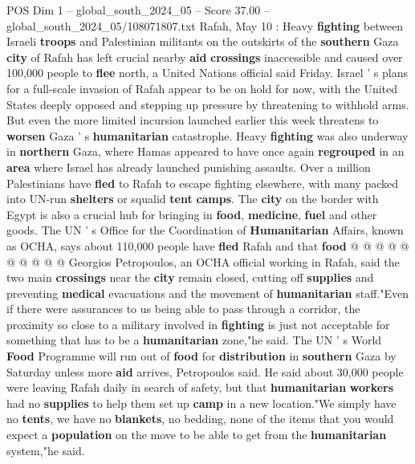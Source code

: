 \begin{textsample}{POS Dim 1 – global\_south\_2024\_05 – Score 37.00 – global\_south\_2024\_05/108071807.txt}  \label{ex:f1_pos_074}
Rafah, May 10 : Heavy \textbf{fighting} between Israeli \textbf{troops} and Palestinian militants on the outskirts of the \textbf{southern} Gaza \textbf{city} of Rafah has left crucial nearby \textbf{aid} \textbf{crossings} inaccessible and caused over 100,000 people to \textbf{flee} north, a United Nations official said Friday.
Israel ' s plans for a full-scale invasion of Rafah appear to be on hold for now, with the United States deeply opposed and stepping up pressure by threatening to withhold arms.
But even the more limited incursion launched earlier this week threatens to \textbf{worsen} Gaza ' s \textbf{humanitarian} catastrophe.
Heavy \textbf{fighting} was also underway in \textbf{northern} Gaza, where Hamas appeared to have once again \textbf{regrouped} in an \textbf{area} where Israel has already launched punishing assaults.
Over a million Palestinians have \textbf{fled} to Rafah to escape fighting elsewhere, with many packed into UN-run \textbf{shelters} or squalid \textbf{tent} \textbf{camps}.
The \textbf{city} on the border with Egypt is also a crucial hub for bringing in \textbf{food}, \textbf{medicine}, \textbf{fuel} and other goods.
The UN ' s Office for the Coordination of \textbf{Humanitarian} Affairs, known as OCHA, says about 110,000 people have \textbf{fled} Rafah and that \textbf{food} @ @ @ @ @ @ @ @ @ @ Georgios Petropoulos, an OCHA official working in Rafah, said the two main \textbf{crossings} near the \textbf{city} remain closed, cutting off \textbf{supplies} and preventing \textbf{medical} evacuations and the movement of \textbf{humanitarian} staff."Even if there were assurances to us being able to pass through a corridor, the proximity so close to a military involved in \textbf{fighting} is just not acceptable for something that has to be a \textbf{humanitarian} zone,"he said.
The UN ' s World \textbf{Food} Programme will run out of \textbf{food} for \textbf{distribution} in \textbf{southern} Gaza by Saturday unless more \textbf{aid} arrives, Petropoulos said.
He said about 30,000 people were leaving Rafah daily in search of safety, but that \textbf{humanitarian} \textbf{workers} had no \textbf{supplies} to help them set up \textbf{camp} in a new location."We simply have no \textbf{tents}, we have no \textbf{blankets}, no bedding, none of the items that you would expect a \textbf{population} on the move to be able to get from the \textbf{humanitarian} system,"he said.

\end{textsample}
